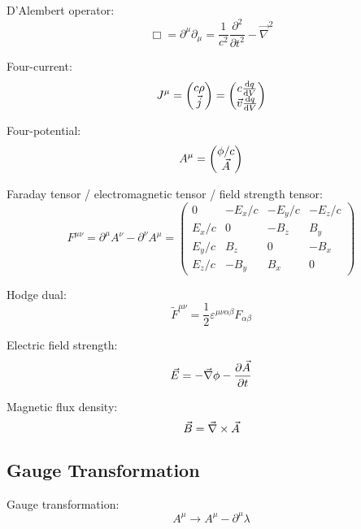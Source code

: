 		\noindent
		D'Alembert operator:
		\begin{equation}
			\Box = \partial^\mu \partial_\mu = \frac{1}{c^2}\frac{\partial^2}{\partial t^2} - \vec{\nabla}^2
		\end{equation}

		\noindent
		Four-current:
		\begin{equation}
			J^\mu = \left(\begin{matrix}c\rho\\\vec{j}\end{matrix}\right) = \left(\begin{matrix}c\dv{q}{V}\\\vec{v}\dv{q}{V}\end{matrix}\right)
		\end{equation}

		\noindent
		Four-potential:
		\begin{equation}
			A^\mu = \left(\begin{matrix}\phi/c\\\vec{A}\end{matrix}\right)
		\end{equation}

		\noindent
		Faraday tensor / electromagnetic tensor / field strength tensor:
		\begin{equation}
			F^{\mu\nu} = \partial^\mu A^\nu - \partial^\nu A^\mu
			= \left( \begin{matrix}
				0 & -E_x/c & -E_y/c & -E_z/c \\
				E_x/c & 0 & -B_z & B_y \\
				E_y/c	& B_z & 0 & -B_x \\
				E_z/c & -B_y & B_x & 0
			\end{matrix} \right)
		\end{equation}

		\noindent
		Hodge dual:
		\begin{equation}
			\tilde{F}^{\mu\nu} = \frac{1}{2}\varepsilon^{\mu\nu\alpha\beta}F_{\alpha\beta}
		\end{equation}

		\noindent
		Electric field strength:
		\begin{equation}
			\vec{E} = -\vec{\nabla}\phi-\pdv{\vec{A}}{t}
		\end{equation}

		\noindent
		Magnetic flux density:
		\begin{equation}
			\vec{B} = \vec{\nabla}\times\vec{A}
		\end{equation}

	\subsection{Gauge Transformation}
		\noindent
		Gauge transformation:
		\begin{equation}
			A^\mu \rightarrow A^\mu-\partial^\mu \lambda
		\end{equation}

